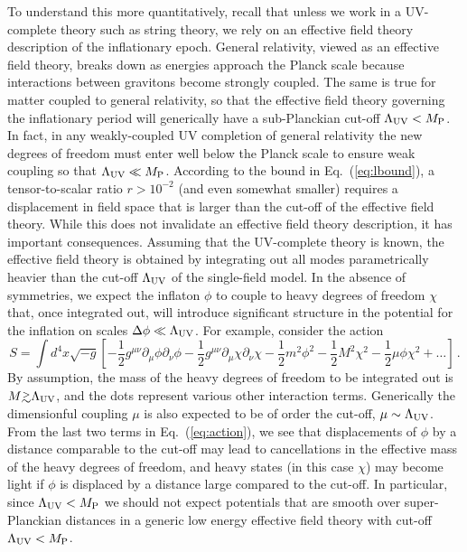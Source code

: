To understand this more quantitatively, recall that unless we work in a UV-complete theory such as string theory, we rely on an effective field theory description of the inflationary epoch. General relativity, viewed as an effective field theory, breaks down as energies approach the Planck scale because interactions between gravitons become strongly coupled. The same is true for matter coupled to general relativity, so that the effective field theory governing the inflationary period will generically have a sub-Planckian cut-off $\Lambda_{\rm UV}<M_{\rm P}$. In fact, in any weakly-coupled UV completion of general relativity the new degrees of freedom must enter well below the Planck scale to ensure weak coupling so that $\Lambda_{\rm UV}\ll M_{\rm P}$. 
According to the bound in Eq.~(\ref{eq:lbound}), a tensor-to-scalar ratio $r>10^{-2}$ (and even somewhat smaller) requires a displacement in field space that is larger than the cut-off of the effective field theory. While this does not invalidate an effective field theory description, it has important consequences. Assuming that the UV-complete theory is known, the effective field theory is obtained by integrating out all modes parametrically heavier than the cut-off $\Lambda_{\rm UV}$ of the single-field model. In the absence of symmetries, we expect the inflaton $\phi$ to couple to heavy degrees of freedom $\chi$ that, once integrated out, will introduce significant structure in the potential for the inflation on scales $\Delta\phi\ll \Lambda_{\rm UV}$. For example, consider the action
\begin{equation}\label{eq:action}
S=\int d^4x\sqrt{-g}\left[-\frac12g^{\mu\nu}\partial_\mu\phi\partial_\nu\phi-\frac12g^{\mu\nu}\partial_\mu\chi\partial_\nu\chi-\frac12m^2\phi^2-\frac12M^2\chi^2-\frac12\mu\phi\chi^2+\dots\right]\,.
\end{equation}
By assumption, the mass of the heavy degrees of freedom to be integrated out is $M\gtrsim\Lambda_{\rm UV}$, and the dots represent various other interaction terms. Generically the dimensionful coupling $\mu$ is also expected to be of order the cut-off, $\mu\sim\Lambda_{\rm UV}$. From the last two terms in Eq.~(\ref{eq:action}), we see that displacements of $\phi$ by a distance comparable to the cut-off may lead to cancellations in the effective mass of the heavy degrees of freedom, and heavy states (in this case $\chi$) may become light if $\phi$ is displaced by a distance large compared to the cut-off. In particular, since $\Lambda_{\rm UV}<M_{\rm P}$ we should not expect potentials that are smooth over super-Planckian distances in a generic low energy effective field theory with cut-off $\Lambda_{\rm UV}<M_{\rm P}$. 

